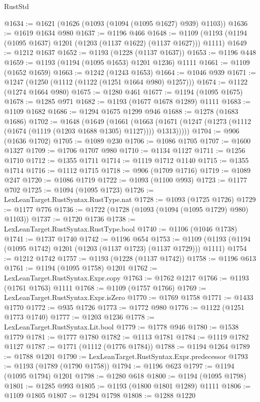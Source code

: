\begin{lexlean}{RustStd}
\begin{coremodule}
@1634 := @1621 (@1626 (@1093 (@1094 (@1095 @1627) @939) @1103))
@1636 := @1619 @1634 @980
@1637 := @1196 @466
@1648 := @1109 (@1193 (@1194 (@1095 @1637) @1201 (@1203 (@1137 @1622) (@1137 @1627))) @1111)
@1649 := @1212 @1637
@1652 := @1193 (@1228 (@1137 @1637))
@1653 := @1196 @448
@1659 := @1193 (@1194 (@1095 @1653) @1201 @1236) @1111
@1661 := @1109 (@1652 @1659)
@1663 := @1242 (@1243 @1653)
@1664 := @1046 @939
@1671 := @1247 (@1250 (@1112 (@1122 (@1251 @1664 @980) @1257)))
@1674 := @1122 (@1274 @1664 @980)
@1675 := @1280 @461
@1677 := @1194 (@1095 @1675)
@1678 := @1285 @971
@1682 := @1193 (@1677 @1678 @1289) @1111
@1683 := @1109 @1682
@1686 := @1294 @1675 @1299 @946
@1688 := @1278 (@1683 @1686)
@1702 := @1648
    (@1649
      (@1661
        (@1663 (@1671 (@1247 (@1273 (@1112 (@1674 (@1119 (@1203 @1688 @1305) @1127)))) @1313)))))
@1704 := @906 (@1636 @1702)
@1705 := @1089 @230
@1706 := @1086 @1705
@1707 := @1600 @1327
@1709 := @1706 @1707 @980
@1710 := @1134 @1127
@1711 := @1256 @1710
@1712 := @1355 @1711
@1714 := @1119 @1712 @1140
@1715 := @1355 @1714
@1716 := @1112 @1715
@1718 := @906 (@1709 @1716)
@1719 := @1089 @247
@1720 := @1086 @1719
@1722 := @1093 (@1100 @993)
@1723 := @1177 @702
@1725 := @1094 (@1095 @1723)
@1726 := LexLeanTarget.RustSyntax.RustType.nat
@1728 := @1093 (@1725 @1726)
@1729 := @1177 @776
@1736 := @1722 (@1728 (@1093 (@1094 (@1095 @1729) @980) @1103))
@1737 := @1720 @1736
@1738 := LexLeanTarget.RustSyntax.RustType.bool
@1740 := @1106 (@1046 @1738)
@1741 := @1737 @1740
@1742 := @1196 @654
@1753 := @1109 (@1193 (@1194 (@1095 @1742) @1201 (@1203 (@1137 @1723) (@1137 @1729))) @1111)
@1754 := @1212 @1742
@1757 := @1193 (@1228 (@1137 @1742))
@1758 := @1196 @613
@1761 := @1194 (@1095 @1758) @1201
@1762 := LexLeanTarget.RustSyntax.Expr.copy
@1763 := @1762 @1217
@1766 := @1193 (@1761 @1763) @1111
@1768 := @1109 (@1757 @1766)
@1769 := LexLeanTarget.RustSyntax.Expr.isZero
@1770 := @1769 @1758
@1771 := @1433 @1770
@1772 := @935 @1726
@1773 := @1772 @980
@1776 := @1122 (@1251 @1773 @1740)
@1777 := @1203 @1236
@1778 := LexLeanTarget.RustSyntax.Lit.bool
@1779 := @1778 @946
@1780 := @1538 @1779
@1781 := @1777 @1780
@1782 := @1113 @1781
@1784 := @1119 @1782 @1127
@1787 := @1771 (@1112 (@1776 @1784))
@1788 := @1194 @1264
@1789 := @1788 @1201
@1790 := LexLeanTarget.RustSyntax.Expr.predecessor
@1793 := @1193 (@1789 (@1790 @1758))
@1794 := @1196 @623
@1797 := @1194 (@1095 @1794) @1201
@1798 := @1280 @618
@1800 := @1194 (@1095 @1798)
@1801 := @1285 @993
@1805 := @1193 (@1800 @1801 @1289) @1111
@1806 := @1109 @1805
@1807 := @1294 @1798
@1808 := @1288 @1220

\end{coremodule}
\end{lexlean}
